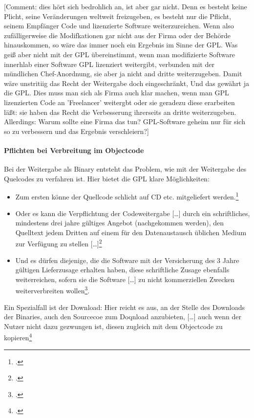 \documentclass[DIV=calc,BCOR=5mm,11pt,headings=small,oneside,abstract=true, toc=bib]{scrartcl}
\begin{document}
[Comment: dies hört sich bedrohlich an, ist aber gar nicht. Denn es besteht
keine Plicht, seine Veränderungen weltweit freizugeben, es besteht nur die
Pflicht, seinem Empfänger Code und lizenzierte Software weiterzureichen. Wenn
also zufälligerweise die Modifkationen gar nicht aus der Firma oder der Behörde
hinauskommen, so wäre das immer noch ein Ergebnis im Sinne der GPL. Was geiß
aber nicht mit der GPL übereinstimmt, wenn man modifizierte Software innerhlab
einer Software GPL lizenziert weitergibt, verbunden mit der mündlichen
Chef-Anordnung, sie aber ja nicht and dritte weiterzugeben. Damit wäre
unstritiig das Recht der Weitergabe doch eingeschränkt, Und das gewährt ja die
GPL. Dies muss man sich als Firma auch klar machen, wenn man GPL lizenzierten
Code an 'Freelancer' weitergbt oder sie geradezu diese erarbeiten läßt: sie
haben das Recht die Verbesserung ihrerseits an dritte weiterzugeben.
Allerdings: Warum sollte eine Firma das tun? GPL-Software geheim nur für sich
so zu verbessern und das Ergebnis verschleiern?]

\paragraph{Pflichten bei Verbreitung im Objectcode}

Bei der Weitergabe als Binary entsteht das Problem, wie mit der Weitergabe des
Quelcodes zu verfahren ist. Hier bietet die GPL klare Möglichkeiten:

\begin{itemize}
  \item Zum ersten könne der Quellcode schlicht auf CD etc. mitgeliefert
  werden.\footcite[vgl.][46]{Oberhem2008a}
  \item Oder es kann die Verpflichtung der Codeweitergabe \glqq{}[\ldots]
  durch ein schriftliches, mindestens drei jahre gültiges Angebot
  (nachgekommen werden), den Quelltext jedem Dritten auf einem für den
  Datenaustausch üblichen Medium zur Verfügung zu stellen
  [\ldots]\grqq{}\footcite[vgl.][46]{Oberhem2008a}
  \item Und es dürfen diejenige, die die Software mit der Versicherung des 3
  Jahre gültigen Lieferzusage erhalten haben, diese schriftliche Zusage
  ebenfalls weiterreichen, sofern sie die Software \glqq{}[\ldots] zu nicht
  kommerziellen Zwecken weiterverbreiten
  wollen\grqq{}\footcite[vgl.][47]{Oberhem2008a}.
\end{itemize}

Ein Spezialfall ist der Download: Hier reicht es aus, an der Stelle des
Downloads der Binaries, auch den Sourcecoe zum Doqnload anzubieten,
\glqq{}[\ldots] auch wenn der Nutzer nicht dazu gezwungen ist, diesen
zugleich mit dem Objectcode zu kopieren\grqq{}\footcite[vgl.][47]{Oberhem2008a}
\end{document}
